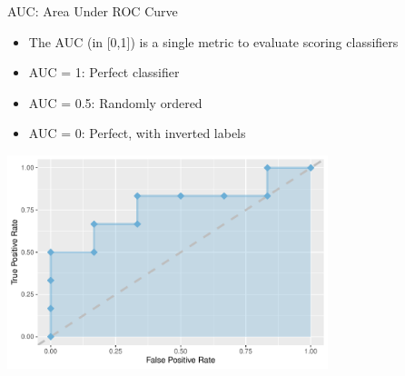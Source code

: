 \documentclass[11pt,compress,t,notes=noshow, xcolor=table]{beamer}
\newenvironment{knitrout}{}{} %
\begin{document}
\begin{vbframe}{AUC: Area Under ROC Curve}

\begin{itemize}
  \item The AUC (in [0,1]) is a single metric to evaluate scoring classifiers
  \item AUC = 1: Perfect classifier
  \item AUC = 0.5: Randomly ordered
  \item AUC = 0: Perfect, with inverted labels
\end{itemize}
\begin{knitrout}\scriptsize
{}\color{fgcolor}

{\centering \includegraphics[width=0.7\textwidth]{figure/eval_mclass_roc_sp_12_1} 

}



\end{knitrout}
% 
% 
% 
% 


% 
% 
% 



\end{knitrout}

\end{vbframe}

\endlecture
\end{document}
